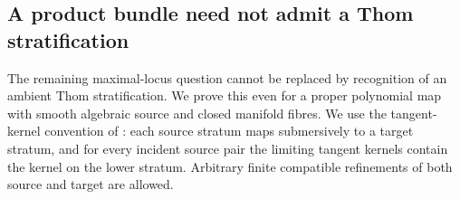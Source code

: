 \subsection{A product bundle need not admit a Thom stratification}

The remaining maximal-locus question cannot be replaced by recognition of
an ambient Thom stratification. We prove this even for a proper polynomial
map with smooth algebraic source and closed manifold fibres. We use the
tangent-kernel convention of
\cite[Definitions 2.1--2.2]{A5-GimenezConejeroLeNuno2023}: each source
stratum maps submersively to a target stratum, and for every incident
source pair the limiting tangent kernels contain the kernel on the
lower stratum. Arbitrary finite compatible refinements of both source
and target are allowed.

